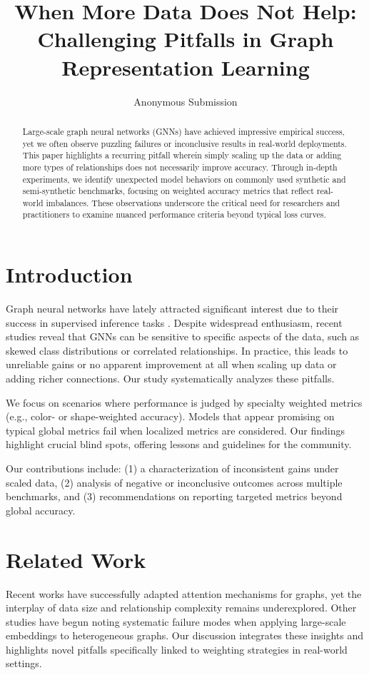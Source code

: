 \documentclass{article}
\title{\bf When More Data Does Not Help:\\ Challenging Pitfalls in Graph Representation Learning}
\author{Anonymous Submission}
\date{}
\begin{document}
\maketitle

\begin{abstract}
Large-scale graph neural networks (GNNs) have achieved impressive empirical success, yet we often observe puzzling failures or inconclusive results in real-world deployments. This paper highlights a recurring pitfall wherein simply scaling up the data or adding more types of relationships does not necessarily improve accuracy. Through in-depth experiments, we identify unexpected model behaviors on commonly used synthetic and semi-synthetic benchmarks, focusing on weighted accuracy metrics that reflect real-world imbalances. These observations underscore the critical need for researchers and practitioners to examine nuanced performance criteria beyond typical loss curves.
\end{abstract}

\section{Introduction}
Graph neural networks have lately attracted significant interest due to their success in supervised inference tasks \citep{kipf2017semi}. Despite widespread enthusiasm, recent studies reveal that GNNs can be sensitive to specific aspects of the data, such as skewed class distributions or correlated relationships. In practice, this leads to unreliable gains or no apparent improvement at all when scaling up data or adding richer connections. Our study systematically analyzes these pitfalls.

We focus on scenarios where performance is judged by specialty weighted metrics (e.g., color- or shape-weighted accuracy). Models that appear promising on typical global metrics fail when localized metrics are considered. Our findings highlight crucial blind spots, offering lessons and guidelines for the community.

Our contributions include: 
(1) a characterization of inconsistent gains under scaled data, 
(2) analysis of negative or inconclusive outcomes across multiple benchmarks, and 
(3) recommendations on reporting targeted metrics beyond global accuracy.

\section{Related Work}
Recent works \citep{velickovic2018graph} have successfully adapted attention mechanisms for graphs, yet the interplay of data size and relationship complexity remains underexplored. Other studies \citep{yang2021evaluation} have begun noting systematic failure modes when applying large-scale embeddings to heterogeneous graphs. Our discussion integrates these insights and highlights novel pitfalls specifically linked to weighting strategies in real-world settings.
\end{document}
